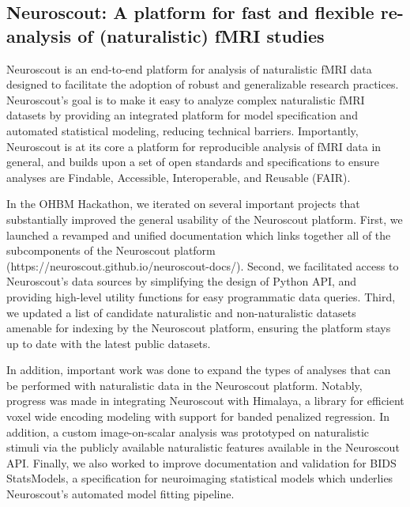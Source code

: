 \documentclass[../main.tex]{subfiles}
\begin{document}
\subsection{Neuroscout: A platform for fast and flexible re-analysis of (naturalistic) fMRI studies}

%

Neuroscout is an end-to-end platform for analysis of naturalistic fMRI data designed to facilitate the adoption of robust and generalizable research practices. Neuroscout’s goal is to make it easy to analyze complex naturalistic fMRI datasets by providing an integrated platform for model specification and automated statistical modeling, reducing technical barriers. Importantly, Neuroscout is at its core a platform for reproducible analysis of fMRI data in general, and builds upon a set of open standards and specifications to ensure analyses are Findable, Accessible, Interoperable, and Reusable (FAIR). 

In the OHBM Hackathon, we iterated on several important projects that substantially improved the general usability of the Neuroscout platform. First, we launched a revamped and unified documentation which links together all of the subcomponents of the Neuroscout platform (https://neuroscout.github.io/neuroscout-docs/). Second, we facilitated access to Neuroscout’s data sources by simplifying the design of Python API, and providing high-level utility functions for easy programmatic data queries. Third, we updated a list of candidate naturalistic and non-naturalistic datasets amenable for indexing by the Neuroscout platform, ensuring the platform stays up to date with the latest public datasets. 

In addition, important work was done to expand the types of analyses that can be performed with naturalistic data in the Neuroscout platform. Notably, progress was made in integrating Neuroscout with Himalaya, a library for efficient voxel wide encoding modeling with support for banded penalized regression. In addition, a custom image-on-scalar analysis was prototyped on naturalistic stimuli via the publicly available naturalistic features available in the Neuroscout API. Finally, we also worked to improve documentation and validation for BIDS StatsModels, a specification for neuroimaging statistical models which underlies Neuroscout’s automated model fitting pipeline. 
\end{document}
